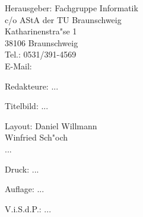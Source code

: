 \begin{nimpressum}
\item[Herausgeber:]
	Fachgruppe Informatik\\
	c/o AStA der TU Braunschweig\\
	Katharinenstra"se 1\\
	38106 Braunschweig\\
	Tel.: 0531/391-4569\\
	E-Mail: \\
\item[Redakteure:]
	...
\item[Titelbild:]
	...
\item[Layout:]
	Daniel Willmann\\
	Winfried Sch"och\\
	...
\item[Druck:]
	...
\item[Auflage:]
	...
\item[V.i.S.d.P.:]  %
	...
\end{nimpressum}
